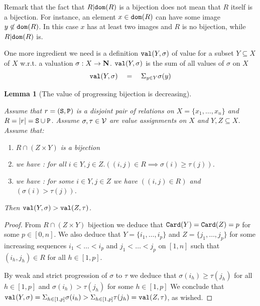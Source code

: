 \documentclass{lmcs}
\newtheorem{lemma}[theorem]{Lemma}
\begin{document}

Remark that the fact that $R{|} {\tt dom}(R)$ is a bijection 
does not mean that $R$ itself is a bijection. For instance, an element 
$x \in {\tt dom}(R)$ can have some image $y \not \in {\tt dom}(R)$. In this case $x$ 
has at least two images and $R$ is no bijection, while $R{|} {\tt dom}(R)$ is.

One more ingredient we need is a definition ${\tt val}(Y,\sigma)$ of value for 
a subset $Y \subseteq X$ of $X$ w.r.t. a valuation 
$\sigma:X \rightarrow {\bf N}$. 
${\tt val}(Y,\sigma)$ is the sum of all values of $\sigma$ on $X$ 
$$
	{\tt val}(Y,\sigma)  \ \ \ = \ \ \  \Sigma_{y \in Y} \sigma(y)
$$


\begin{lemma}[The value of progressing bijection is decreasing]
\label{lemma-decreasing-progressing-bijection}

Assume that $r = ({\tt S},{\tt P})$ is a disjoint pair of 
relations on $X = \{x_1, \ldots, x_n\}$
and $R= {| r |} = {\tt S} \cup {\tt P}$.
Assume $\sigma, \tau \in {{\mathcal V}}$ are value assignments on $X$
and $Y, Z \subseteq X$. Assume that:

\begin{enumerate}
\item
$R \cap (Z \times Y)$ is a bijection 
\item
we have
:
for all $i \in Y, j \in Z. ((i,j) \in R \implies \sigma(i) \ge \tau(j))$.
\item
we have :
for some $i \in Y, j \in Z$ we have
$((i,j) \in R)$ and $(\sigma(i) > \tau(j))$.
\end{enumerate}

Then ${\tt val}(Y,\sigma) > {\tt val}(Z,\tau)$.

\end{lemma}


\begin{proof}
From $R \cap (Z \times Y)$ bijection we deduce that
 ${\tt Card}(Y) = {\tt Card}(Z) = p$ for some $p \in [0,n]$. 
We also deduce that $Y = \{i_1, \ldots, i_p\}$ and $Z = \{j_1, \ldots, j_p\}$
for some increasing sequences $i_1 < \ldots < i_p$
and $j_1 < \ldots < j_p$ on $[1,n]$ such that $(i_h, j_h) \in R$ for all
$h \in [1,p]$.

By weak and strict progression of $\sigma$ to $\tau$ we deduce that 
$\sigma(i_h) \ge \tau(j_h)$ for all $h \in [1,p]$
and $\sigma(i_h) > \tau(j_h)$ for some $h \in [1,p]$
We conclude that 
$
{\tt val}(Y,\sigma)                               = 
\Sigma_{h \in [1,p]} \sigma(i_h) >  
\Sigma_{h \in [1,p]} \tau(j_h)      =
{\tt val}(Z,\tau)
$,
as wished. 
\end{proof}
\end{document}

